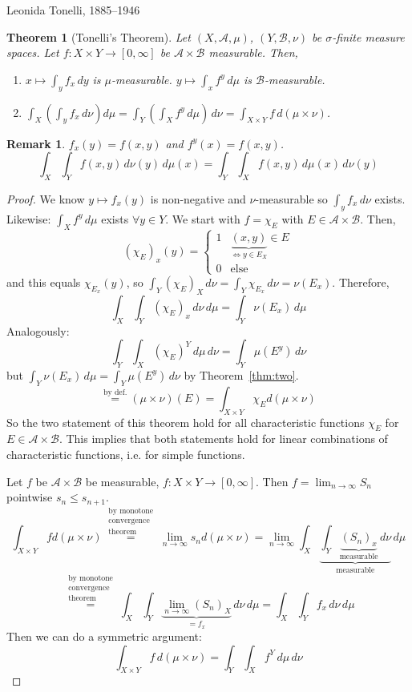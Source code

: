 \documentclass{article}
\newtheorem{theorem}{Theorem}  \numberwithin{theorem}{section}
\newtheorem{remark}{Remark}  \numberwithin{remark}{section}
\newcommand{\mtn}{(\mu\times\nu)} %
\begin{document}
Leonida Tonelli, 1885--1946

\begin{theorem}[Tonelli's Theorem]
  Let $(X, \mathcal A, \mu)$, $(Y, \mathcal B, \nu)$ be $\sigma$-finite measure spaces.
  Let $f: X \times Y \to [0, \infty]$ be $\mathcal A \times \mathcal B$ measurable. Then,
  \begin{enumerate}
    \item $x \mapsto \int_y f_x \, dy$ is $\mu$-measurable. $y \mapsto \int_x f^y \, d\mu$ is $\mathcal B$-measurable.
    \item $\int_X \left( \int_y f_x \, d\nu\right) d\mu = \int_Y \left(\int_X f^y \, d\mu\right) \, d\nu = \int_{X \times Y} f \, d(\mu \times \nu)$.
  \end{enumerate}
\end{theorem}
\begin{remark}
  $f_x(y) = f(x, y)$ and $f^y(x) = f(x,y)$.
  \[ \int_X \int_Y f(x,y) \, d\nu(y) \, d\mu(x) = \int_Y \int_X f(x,y) \, d\mu(x) \, d\nu(y) \]
\end{remark}
\begin{proof}
  We know $y \mapsto f_x(y)$ is non-negative and $\nu$-measurable so $\int_y f_x\, d\nu$ exists.
  Likewise: $\int_X f^y \, d\mu$ exists $\forall y \in Y$.
  We start with $f = \chi_E$ with $E \in \mathcal A \times \mathcal B$.
  Then, \[ (\chi_E)_x(y) = \begin{cases} 1 & \underbrace{(x,y)}_{\Leftrightarrow y \in E_X} \in E \\ 0 & \text{else} \end{cases} \]
  and this equals $\chi_{E_x}(y)$, so  $\int_Y(\chi_E)_X\,d\nu = \int_Y \chi_{E_x} \, d\nu = \nu(E_x)$. Therefore,
  \[ \int_X \int_Y (\chi_E)_x \, d\nu \, d\mu = \int_Y \nu(E_x) \,d\mu \]
  Analogously:
  \[ \int_Y \int_X (\chi_E)^Y \, d\mu \, d\nu = \int_Y \mu(E^y) \, d\nu \]
  but $\int_Y \nu(E_x) \,d\mu = \int_Y \mu(E^y) \, d\nu$ by Theorem~\ref{thm:two}.
  \[ \stackrel{\text{by def.}}{=} \mtn(E) = \int_{X\times Y} \chi_E d\mtn \]
  So the two statement of this theorem hold for all characteristic functions $\chi_E$ for $E \in \mathcal A \times \mathcal B$.
  This implies that both statements hold for linear combinations of characteristic functions, i.e. for simple functions.

  Let $f$ be $\mathcal A \times \mathcal B$ be measurable, $f: X \times Y \to [0, \infty]$. Then
  $f = \lim_{n\to\infty} S_n$ pointwise $s_n \leq s_{n+1}$.
  \[ \int_{X\times Y} f d\mtn \stackrel{\substack{\text{by monotone} \\ \text{convergence} \\ \text{theorem}}}{=} \lim_{n\to\infty} s_n d \mtn = \lim_{n\to\infty} \int_X \underbrace{\int_Y \underbrace{(S_n)_x}_{\text{measurable}} \, d\nu}_{\text{measurable}} \, d\mu \]
  \[ \stackrel{\substack{\text{by monotone} \\ \text{convergence} \\ \text{theorem}}}{=} \int_X \int_Y \underbrace{\lim_{n\to\infty} (S_n)_X}_{=f_x} \, d\nu \, d\mu = \int_X \int_Y f_x \, d\nu \, d\mu \]
  Then we can do a symmetric argument:
  \[ \int_{X \times Y} f \, d(\mu \times \nu) = \int_Y \int_X f^Y \, d\mu \, d\nu \]
\end{proof}
\end{document}
